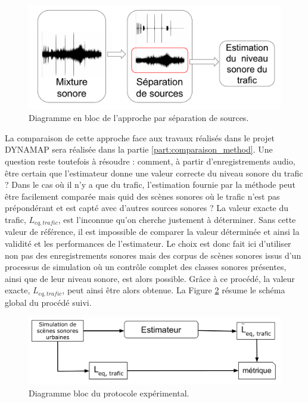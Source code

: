 \begin{figure}[ht]
\centering
\includegraphics[width=0.7\linewidth]{./figures/NMF/bloc_diagram_source_separation.pdf}
\caption{Diagramme en bloc de l'approche par séparation de sources.}
\label{fig:separation_source}
\end{figure}

La comparaison de cette approche face aux travaux réalisés dans le projet DYNAMAP sera réalisée dans la partie \ref{part:comparaison_method}. Une question reste toutefois à résoudre : comment, à partir d'enregistrements audio, être certain que l'estimateur donne une valeur correcte du niveau sonore du trafic ? Dans le cas où il n'y a que du trafic, l'estimation fournie par la méthode peut être facilement comparée mais quid des scènes sonores où le trafic n'est pas prépondérant et est capté avec d'autres sources sonores ? La valeur exacte du trafic, $L_{eq,trafic}$, est l'inconnue qu'on cherche justement à déterminer. Sans cette valeur de référence, il est impossible de comparer la valeur déterminée et ainsi la validité et les performances de l'estimateur.
Le choix est donc fait ici d'utiliser non pas des enregistrements sonores mais des corpus de scènes sonores issus d'un processus de simulation où un contrôle complet des classes sonores présentes, ainsi que de leur niveau sonore, est alors possible. Grâce à ce procédé, la valeur exacte, $L_{eq,trafic}$, peut ainsi être alors obtenue. La Figure \ref{fig:diagramBlocProtocol} résume le schéma global du procédé suivi.

\begin{figure}[ht]
\centering
\includegraphics[width=0.7\linewidth]{./figures/NMF/Bloc_diagram_estimateur_FR.pdf}
\caption{Diagramme bloc du protocole expérimental.}
\label{fig:diagramBlocProtocol}
\end{figure}

